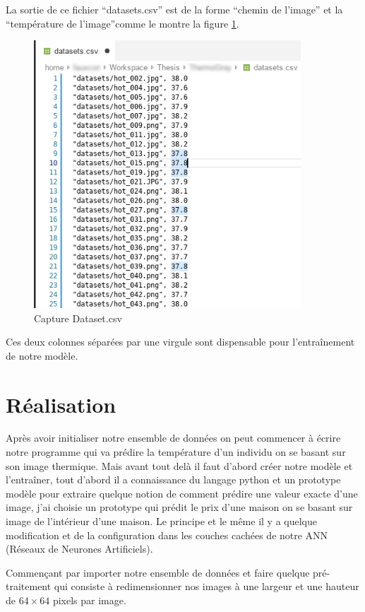 \documentclass[12pt]{article}
\begin{document}
La sortie de ce fichier “datasets.csv” est de la forme “chemin de l’image” et la “température de l’image”comme le montre la figure  \ref{fig:dataset.csv}.
\newpage
\begin{figure}[h]
	\centering
	\includegraphics[width=10cm]{img-Chapiter-4/datasets.png}
	\caption{Capture Dataset.csv}
	\label{fig:dataset.csv}
\end{figure}

Ces deux colonnes séparées par une virgule sont dispensable pour l’entraînement de notre modèle.

\section{Réalisation}
Après avoir initialiser notre ensemble de données on peut commencer à écrire notre programme qui va prédire la température d’un individu on se basant sur son image thermique. Mais avant tout delà il faut d’abord créer notre modèle et l’entraîner, tout d’abord il a  connaissance du langage python et un prototype modèle pour extraire quelque notion de comment prédire une valeur exacte d’une image, j’ai choisie un prototype qui prédit le prix d’une maison on se basant sur image de l'intérieur d’une maison. Le principe et le même il y a quelque modification et de la configuration dans les couches cachées de notre ANN (Réseaux de Neurones Artificiels).

Commençant par importer notre ensemble de données et faire quelque pré-traitement qui consiste à redimensionner nos images à une largeur et une hauteur de $64 \times 64$ pixels par image.
\end{document}
